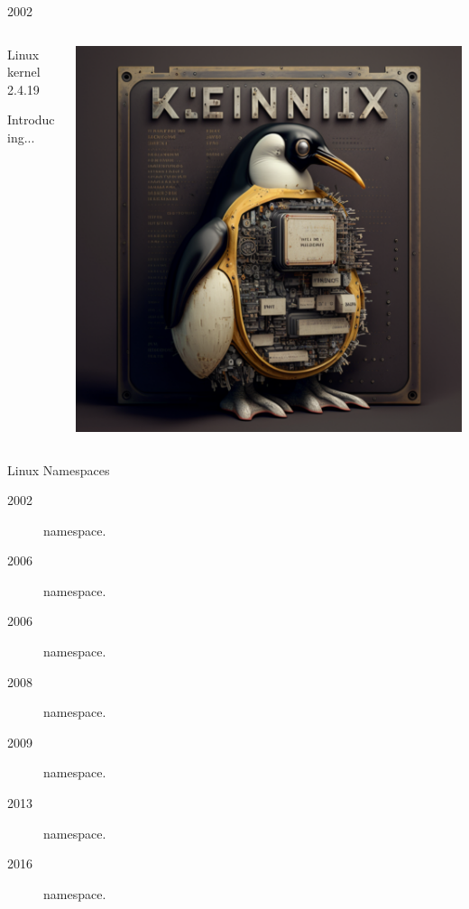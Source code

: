 \documentclass{slide}
\begin{document}
\begin{frame}{2002}
    \begin{columns}
    \begin{column}{0.3\textwidth}
    {\color{primary}\large Linux kernel 2.4.19}
    \vspace{1em}

    Introducing... 
    \end{column}
    \begin{column}{0.7\textwidth}
    \begin{center}
    \includegraphics[height=0.8\textheight]{images/linux-kernel}
    \end{center}
    \end{column}
    \end{columns}

\end{frame}

\begin{frame}{Linux Namespaces}
    \begin{description}
        \item[2002]  namespace.
        \item[2006]  namespace.
        \item[2006]  namespace.
        \item[2008]  namespace.
        \item[2009]  namespace.
        \item[2013]  namespace.
        \item[2016]  namespace.
    \end{description}
\end{frame}
\end{document}
